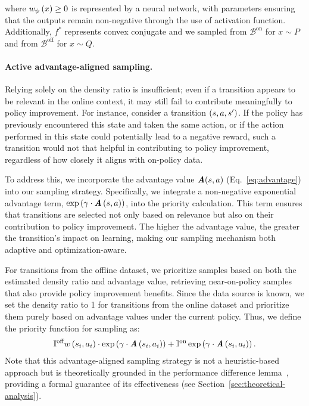         
            

        





where ${w}_{\psi} \left( {x} \right) \geq 0$ is represented by a neural network, with parameters ensuring that the outputs remain non-negative through the use of activation function. Additionally, $f^{*}$ represents convex conjugate and
we sampled from $\mathcal{B}^{\text{on}}$ for $x \sim P$ and from $\mathcal{B}^{\text{off}}$ for $x \sim Q$.




\paragraph{Active advantage-aligned sampling.}
Relying solely on the density ratio is insufficient; even if a transition appears to be relevant in the online context, it may still fail to contribute meaningfully to policy improvement.   
For instance, consider a transition $ \left( {s,a,s'} \right) $. If the policy has previously encountered this state and taken the same action, or if the action performed in this state could potentially lead to a negative reward, such a transition would not that helpful in contributing to policy improvement, regardless of how closely it aligns with on-policy data. 


To address this, we incorporate the advantage value $\textbf{\em A}(s, a)$ (Eq.~\eqref{eq:advantage}) into our sampling strategy. Specifically, we integrate a non-negative exponential advantage term, $\exp \left( {\gamma\cdot\textbf{\em A} \left( {s,a} \right) } \right) $, into the priority calculation. This term ensures that transitions are selected not only based on relevance but also on their contribution to policy improvement. The higher the advantage value, the greater the transition's impact on learning, making our sampling mechanism both adaptive and optimization-aware.  




For transitions from the offline dataset, we prioritize samples based on both the estimated density ratio and advantage value, retrieving near-on-policy samples that also provide policy improvement benefits.  
Since the data source is known, we set the density ratio to 1 for transitions from the online dataset and prioritize them purely based on advantage values under the current policy. Thus, we define the priority function for sampling as: 
\begin{align}
\mathbb{I}^{\text{off}}{w} \left( {s_i,a_i} \right) \cdot\exp \left( {\gamma\cdot\textbf{\em A} \left( {s_i,a_i} \right) } \right) +\mathbb{I}^{\text{on}}\exp \left( {\gamma\cdot\textbf{\em A} \left( {s_i,a_i} \right) } \right) . \notag 
\end{align}
Note that this advantage-aligned sampling strategy is not a heuristic-based approach but is theoretically grounded in the performance difference lemma~\citep{kakade2002approximately}, providing a formal guarantee of its effectiveness (see Section~\ref{sec:theoretical-analysis}).



